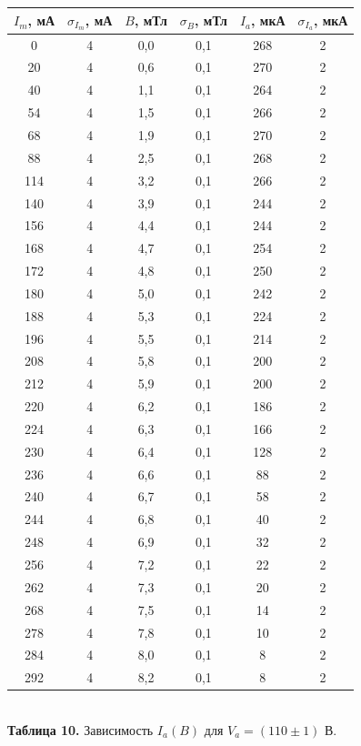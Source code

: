 \documentclass[a4paper, 12pt]{article}%
\begin{document}
\begin{center}
\begin{tabular}{|c|c|c|c|c|c|}
\hline
$I_m$, мА & $\sigma_{I_m}$, мА & $B$, мТл & $\sigma_B$, мТл & $I_a$, мкА & $\sigma_{I_a}$, мкА \\ \hline
0 & 4 & 0,0 & 0,1 & 268 & 2 \\ \hline
20 & 4 & 0,6 & 0,1 & 270 & 2 \\ \hline
40 & 4 & 1,1 & 0,1 & 264 & 2 \\ \hline
54 & 4 & 1,5 & 0,1 & 266 & 2 \\ \hline
68 & 4 & 1,9 & 0,1 & 270 & 2 \\ \hline
88 & 4 & 2,5 & 0,1 & 268 & 2 \\ \hline
114 & 4 & 3,2 & 0,1 & 266 & 2 \\ \hline
140 & 4 & 3,9 & 0,1 & 244 & 2 \\ \hline
156 & 4 & 4,4 & 0,1 & 244 & 2 \\ \hline
168 & 4 & 4,7 & 0,1 & 254 & 2 \\ \hline
172 & 4 & 4,8 & 0,1 & 250 & 2 \\ \hline
180 & 4 & 5,0 & 0,1 & 242 & 2 \\ \hline
188 & 4 & 5,3 & 0,1 & 224 & 2 \\ \hline
196 & 4 & 5,5 & 0,1 & 214 & 2 \\ \hline
208 & 4 & 5,8 & 0,1 & 200 & 2 \\ \hline
212 & 4 & 5,9 & 0,1 & 200 & 2 \\ \hline
220 & 4 & 6,2 & 0,1 & 186 & 2 \\ \hline
224 & 4 & 6,3 & 0,1 & 166 & 2 \\ \hline
230 & 4 & 6,4 & 0,1 & 128 & 2 \\ \hline
236 & 4 & 6,6 & 0,1 & 88 & 2 \\ \hline
240 & 4 & 6,7 & 0,1 & 58 & 2 \\ \hline
244 & 4 & 6,8 & 0,1 & 40 & 2 \\ \hline
248 & 4 & 6,9 & 0,1 & 32 & 2 \\ \hline
256 & 4 & 7,2 & 0,1 & 22 & 2 \\ \hline
262 & 4 & 7,3 & 0,1 & 20 & 2 \\ \hline
268 & 4 & 7,5 & 0,1 & 14 & 2 \\ \hline
278 & 4 & 7,8 & 0,1 & 10 & 2 \\ \hline
284 & 4 & 8,0 & 0,1 & 8 & 2 \\ \hline
292 & 4 & 8,2 & 0,1 & 8 & 2 \\ \hline
\end{tabular}\\
\textbf{Таблица 10.} Зависимость $I_a(B)$ для $V_a = (110 \pm 1)$ В.
\end{center}
\end{document}

